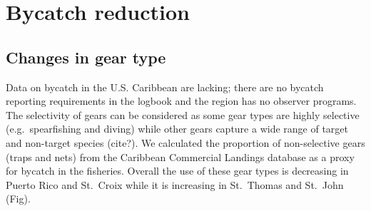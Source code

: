 \documentclass[
  letterpaper,
  oneside,
  open=any]{scrbook}
\begin{document}
\section{Bycatch reduction}\label{bycatch-reduction}

\subsection{Changes in gear type}\label{changes-in-gear-type}

Data on bycatch in the U.S. Caribbean are lacking; there are no bycatch
reporting requirements in the logbook and the region has no observer
programs. The selectivity of gears can be considered as some gear types
are highly selective (e.g.~spearfishing and diving) while other gears
capture a wide range of target and non-target species (cite?). We
calculated the proportion of non-selective gears (traps and nets) from
the Caribbean Commercial Landings database as a proxy for bycatch in the
fisheries. Overall the use of these gear types is decreasing in Puerto
Rico and St.~Croix while it is increasing in St.~Thomas and St.~John
(Fig).

\begin{figure}


\caption{\label{fig-geartypePR}}

\end{figure}%
\end{document}
